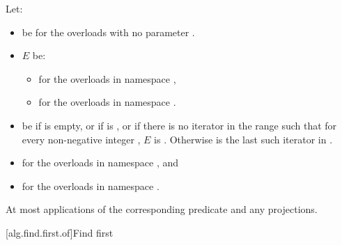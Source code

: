 \begin{itemdescr}
\pnum
Let:
\begin{itemize}
\item
   be 
  for the overloads with no parameter .
\item
  $E$ be:
  \begin{itemize}
  \item
    for the overloads in namespace ,
  \item
    for the overloads in namespace .
  \end{itemize}
\item
   be  if  is empty,
  or if  is ,
  or if there is no iterator
  in the range 
  such that for every non-negative integer
  , $E$ is .
  Otherwise  is the last such iterator
  in .
\end{itemize}

\pnum
\returns
\begin{itemize}
\item {} for the overloads in namespace , and
\item {}
  for the overloads in namespace .
\end{itemize}

\pnum
\complexity
At most
applications of the corresponding predicate and any projections.
\end{itemdescr}

[alg.find.first.of]{Find first}

